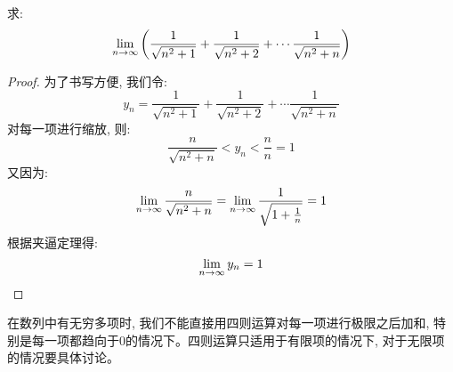 \begin{example}
    求:
    \begin{equation*}
        \lim_{n \to \infty } \left( \frac{1}{\sqrt{n^2+1}} + \frac{1}{\sqrt{n^2 + 2}} + \cdots \frac{1}{\sqrt{n^2+n}} \right)
    \end{equation*}

\end{example}
\begin{proof}
    为了书写方便, 我们令:
    \begin{equation*}
        y_n = \frac{1}{\sqrt{n^2+1}} + \frac{1}{\sqrt{n^2 + 2}} + \cdots \frac{1}{\sqrt{n^2+n}}
    \end{equation*}
    对每一项进行缩放, 则:
    \begin{equation*}
        \frac{n}{\sqrt{n^2+n}} < y_n < \frac{n}{n} = 1
    \end{equation*}
    又因为:
    \begin{equation*}
        \lim_{n \to \infty } \frac{n}{\sqrt{n^2+n}} = \lim_{n \to \infty } \frac{1}{\sqrt{1+\frac{1}{n}}} = 1
    \end{equation*}
    根据夹逼定理得:
    \begin{equation*}
        \lim_{n \to \infty } y_n = 1
    \end{equation*}
\end{proof}
\begin{remark}
    在数列中有无穷多项时, 我们不能直接用四则运算对每一项进行极限之后加和, 特别是每一项都趋向于0的情况下。四则运算只适用于有限项的情况下, 对于无限项的情况要具体讨论。
\end{remark}

